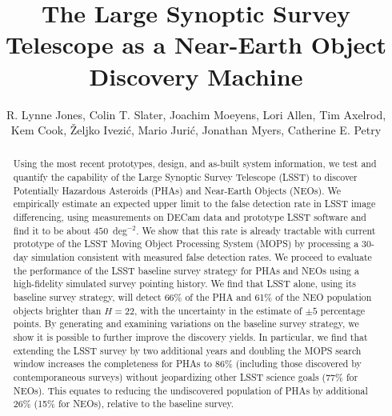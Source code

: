 \documentclass[12pt,preprint]{aastex}
\begin{document}
\title{The Large Synoptic Survey Telescope as a Near-Earth Object Discovery Machine}

\author{R. Lynne Jones,
Colin T. Slater,
Joachim Moeyens,
Lori Allen,
Tim Axelrod,
Kem Cook,
\v{Z}eljko Ivezi\'{c},
Mario Juri\'{c},
Jonathan Myers,
Catherine E. Petry
}

\begin{abstract}
Using the most recent prototypes, design, and as-built system information, we test and quantify the capability of the Large Synoptic Survey Telescope (LSST) to discover Potentially Hazardous Asteroids (PHAs) and Near-Earth Objects (NEOs).
We empirically estimate an expected upper limit to the false detection rate in LSST image differencing, using measurements on DECam data and prototype LSST software and find it to be about $450$~deg$^{-2}$. We show that this rate is already tractable with current prototype of the LSST Moving Object Processing System (MOPS) by processing a 30-day simulation consistent with measured false detection rates.
We proceed to evaluate the performance of the LSST baseline survey strategy for  PHAs and NEOs using a high-fidelity simulated survey pointing history. 
We find that LSST alone, using its baseline survey strategy, will detect 66\% of the PHA and 61\% of the NEO population objects brighter than $H=22$, with the uncertainty in the estimate of $\pm5$ percentage points. By generating and examining variations on the baseline survey strategy, we show it is possible to further improve the discovery yields.
In particular, we find that extending the LSST survey by two additional years and doubling the MOPS search window increases the completeness for PHAs to 86\% (including those discovered by contemporaneous surveys) without jeopardizing other LSST science goals (77\% for NEOs). This equates to reducing the undiscovered population of PHAs by additional 26\% (15\% for NEOs), relative to the baseline survey.
\end{abstract}
\end{document}

